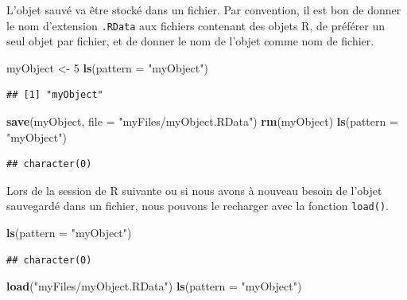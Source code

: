 \documentclass[]{book}
\newenvironment{Shaded}{\begin{snugshade}}{\end{snugshade}}
\newcommand{\DataTypeTok}[1]{\textcolor[rgb]{0.13,0.29,0.53}{#1}}
\newcommand{\DecValTok}[1]{\textcolor[rgb]{0.00,0.00,0.81}{#1}}
\newcommand{\KeywordTok}[1]{\textcolor[rgb]{0.13,0.29,0.53}{\textbf{#1}}}
\newcommand{\NormalTok}[1]{#1}
\newcommand{\StringTok}[1]{\textcolor[rgb]{0.31,0.60,0.02}{#1}}
\begin{document}
L'objet sauvé va être stocké dans un fichier. Par convention, il est bon de donner le nom d'extension \texttt{.RData} aux fichiers contenant des objets R, de préférer un seul objet par fichier, et de donner le nom de l'objet comme nom de fichier.

\begin{Shaded}
\begin{Highlighting}[]
\NormalTok{myObject <-}\StringTok{ }\DecValTok{5}
\KeywordTok{ls}\NormalTok{(}\DataTypeTok{pattern =} \StringTok{"myObject"}\NormalTok{)}
\end{Highlighting}
\end{Shaded}

\begin{verbatim}
## [1] "myObject"
\end{verbatim}

\begin{Shaded}
\begin{Highlighting}[]
\KeywordTok{save}\NormalTok{(myObject, }\DataTypeTok{file =} \StringTok{"myFiles/myObject.RData"}\NormalTok{)}
\KeywordTok{rm}\NormalTok{(myObject)}
\KeywordTok{ls}\NormalTok{(}\DataTypeTok{pattern =} \StringTok{"myObject"}\NormalTok{)}
\end{Highlighting}
\end{Shaded}

\begin{verbatim}
## character(0)
\end{verbatim}

Lors de la session de R suivante ou si nous avons à nouveau besoin de l'objet sauvegardé dans un fichier, nous pouvons le recharger avec la fonction \texttt{load()}.

\begin{Shaded}
\begin{Highlighting}[]
\KeywordTok{ls}\NormalTok{(}\DataTypeTok{pattern =} \StringTok{"myObject"}\NormalTok{)}
\end{Highlighting}
\end{Shaded}

\begin{verbatim}
## character(0)
\end{verbatim}

\begin{Shaded}
\begin{Highlighting}[]
\KeywordTok{load}\NormalTok{(}\StringTok{"myFiles/myObject.RData"}\NormalTok{)}
\KeywordTok{ls}\NormalTok{(}\DataTypeTok{pattern =} \StringTok{"myObject"}\NormalTok{)}
\end{Highlighting}
\end{Shaded}
\end{document}
